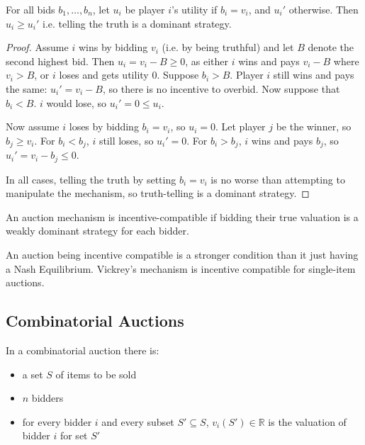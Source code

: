 \begin{theorem}
	For all bids $b_1, \ldots, b_n$, let $u_i$ be player $i$'s utility if $b_i
	= v_i$, and $u_i'$ otherwise. Then $u_i \ge u_i'$ i.e.  telling the truth
	is a dominant strategy.
\end{theorem}

\begin{proof}
	Assume $i$ wins by bidding $v_i$ (i.e. by being truthful) and let $B$
	denote the second highest bid. Then $u_i = v_i - B \ge 0$, as either $i$
	wins and pays $v_i - B$ where $v_i > B$, or $i$ loses and gets utility 0.
	Suppose $b_i > B$. Player $i$ still wins and pays the same: $u_i' = v_i -
	B$, so there is no incentive to overbid. Now suppose that $b_i < B$. $i$
	would lose, so $u_i' = 0 \le u_i$.

	Now assume $i$ loses by bidding $b_i = v_i$, so $u_i = 0$. Let player $j$
	be the winner, so $b_j \ge v_i$. For $b_i < b_j$, $i$ still loses, so $u_i'
	= 0$. For $b_i > b_j$, $i$ wins and pays $b_j$, so $u_i' = v_i - b_j \le
	0$.

	In all cases, telling the truth by setting $b_i = v_i$ is no worse than
	attempting to manipulate the mechanism, so truth-telling is a dominant
	strategy.
\end{proof}

\begin{definition}
	An auction mechanism is incentive-compatible if bidding their true
	valuation is a weakly dominant strategy for each bidder.
\end{definition}

An auction being incentive compatible is a stronger condition than it just
having a Nash Equilibrium. Vickrey's mechanism is incentive compatible for
single-item auctions.

\subsection{Combinatorial Auctions}

In a combinatorial auction there is:

\begin{itemize}
	\itemsep0em
	\item a set $S$ of items to be sold
	\item $n$ bidders
	\item for every bidder $i$ and every subset $S' \subseteq S$,
		$v_i(S') \in \mathbb{R}$ is the valuation of bidder $i$ for set
		$S'$
\end{itemize}

